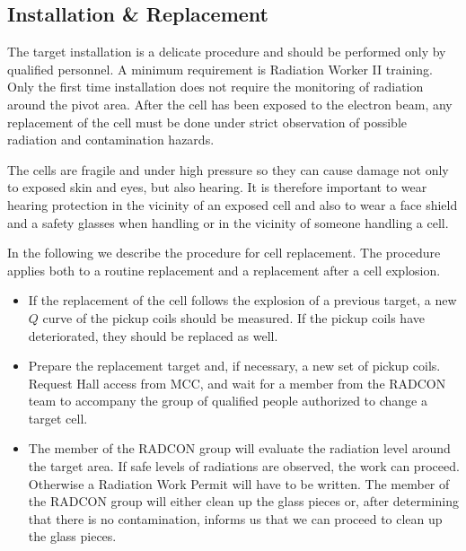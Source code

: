 {\subsection{Installation \& Replacement}

\begin{safetyen}{10}{5}
The target installation is a delicate procedure and should be
performed only by qualified personnel. A minimum requirement is
Radiation Worker II training.  Only the first time installation does
not require the monitoring of radiation around the pivot area. After
the cell has been exposed to the electron beam, any replacement of the
cell must be done under strict observation of possible radiation and
contamination hazards.

The cells are fragile and under high pressure so they can cause damage
not only to exposed skin and eyes, but also hearing.  It is therefore
important to wear hearing protection in the vicinity of an exposed
cell and also to wear a face shield and a safety glasses when handling
or in the vicinity of someone handling a cell.

\end{safetyen}

In the following we describe the procedure for cell replacement. The
procedure applies both to a routine replacement and a replacement
after a cell  explosion.

\begin{itemize}
\item 
If the replacement of the cell follows the explosion of a previous
target, a new $Q$ curve of the pickup coils should be measured. If the
pickup coils have deteriorated, they should be replaced as well.

\item 
Prepare the replacement target and, if necessary, a new set of
pickup coils. Request Hall access from MCC, and wait for a member from
the RADCON team to accompany the group of qualified people authorized
to change a target cell.

\item  
The member of the RADCON group will evaluate the radiation level
around the target area. If safe levels of radiations are observed, the
work can proceed. Otherwise a Radiation Work Permit will have to be
written. The member of the RADCON group will either clean up the 
glass pieces or, after determining that there is no contamination, informs 
us that we can proceed to clean up the glass pieces.


\end{itemize}}

